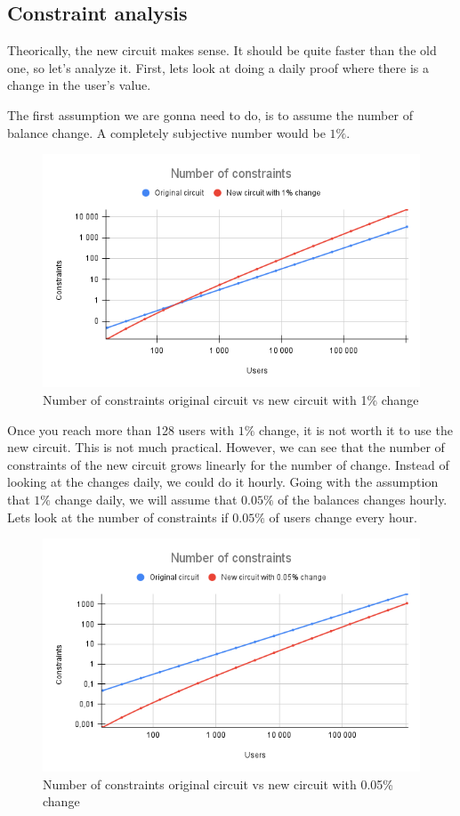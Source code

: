 \subsection{Constraint analysis}
Theorically, the new circuit makes sense. It should be quite faster than the old one, so let's analyze it.
First, lets look at doing a daily proof where there is a change in the user's value.

The first assumption we are gonna need to do, is to assume the number of balance change. A completely subjective number would be $1\%$.
\begin{figure}[H]
   \centering
   \includegraphics[width=130mm]{Number of constraints.png}
   \caption{Number of constraints original circuit vs new circuit with 1\% change}
   \label{overflow}
   \end{figure}
Once you reach more than 128 users with $1\%$ change, it is not worth it to use the new circuit. This is not much practical.
However, we can see that the number of constraints of the new circuit grows linearly for the number of change.
Instead of looking at the changes daily, we could do it hourly.
Going with the assumption that $1\%$ change daily, we will assume that $0.05\%$ of the balances changes hourly.
Lets look at the number of constraints if $0.05\%$ of users change every hour.
\begin{figure}[H]
   \centering
   \includegraphics[width=130mm]{Number of constraints .05.png}
   \caption{Number of constraints original circuit vs new circuit with 0.05\% change}
   \label{overflow}
   \end{figure}
